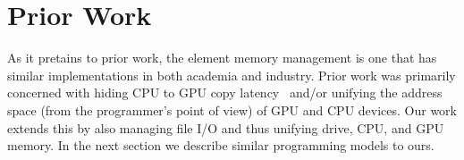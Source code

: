 \section{Prior Work}

As it pretains to prior work, the element memory management
	is one that has similar implementations in both academia
	and industry.
Prior work was primarily concerned with hiding CPU
	to GPU copy latency~\cite{gmac} and/or unifying the 
	address space (from the programmer's point of view)
	of GPU and CPU devices.
Our work extends this by also managing file I/O and thus
	unifying drive, CPU, and GPU memory.
In the next section we describe similar programming models
	to ours.
